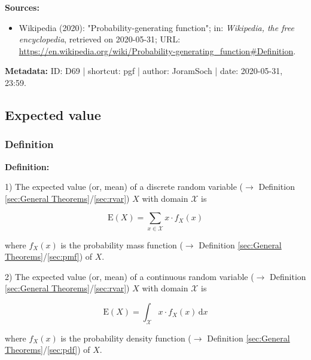 \documentclass[a4paper,12pt,twoside]{book}
\begin{document}
\vspace{1em}
\textbf{Sources:}
\begin{itemize}
\item Wikipedia (2020): "Probability-generating function"; in: \textit{Wikipedia, the free encyclopedia}, retrieved on 2020-05-31; URL: \url{https://en.wikipedia.org/wiki/Probability-generating_function#Definition}.
\end{itemize}


\vspace{1em}
\textbf{Metadata:} ID: D69 | shortcut: pgf | author: JoramSoch | date: 2020-05-31, 23:59.
\vspace{1em}



\subsection{Expected value}

\subsubsection[\textit{Definition}]{Definition} \label{sec:mean}
\setcounter{equation}{0}

\textbf{Definition:}

1) The expected value (or, mean) of a discrete random variable ($\rightarrow$ Definition \ref{sec:General Theorems}/\ref{sec:rvar}) $X$ with domain $\mathcal{X}$ is

\begin{equation} \label{eq:mean-mean-disc}
\mathrm{E}(X) = \sum_{x \in \mathcal{X}} x \cdot f_X(x)
\end{equation}

where $f_X(x)$ is the probability mass function ($\rightarrow$ Definition \ref{sec:General Theorems}/\ref{sec:pmf}) of $X$.

\vspace{1em}
2) The expected value (or, mean) of a continuous random variable ($\rightarrow$ Definition \ref{sec:General Theorems}/\ref{sec:rvar}) $X$ with domain $\mathcal{X}$ is

\begin{equation} \label{eq:mean-mean-cont}
\mathrm{E}(X) = \int_{\mathcal{X}} x \cdot f_X(x) \, \mathrm{d}x
\end{equation}

where $f_X(x)$ is the probability density function ($\rightarrow$ Definition \ref{sec:General Theorems}/\ref{sec:pdf}) of $X$.
\end{document}
